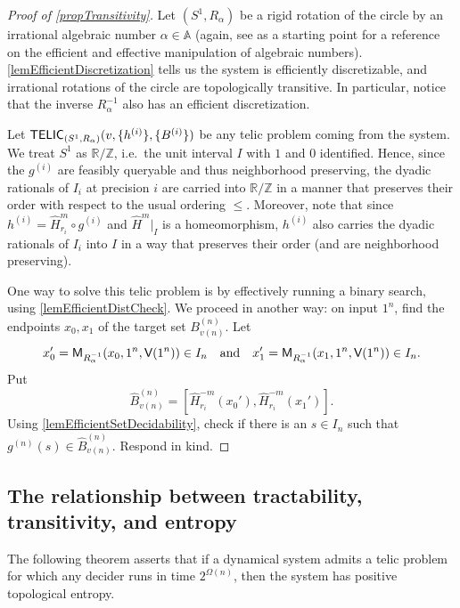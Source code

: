 \documentclass{amsart}
\theoremstyle{theorem}
\theoremstyle{remark}
\numberwithin{equation}{section}
\renewcommand{\AA}{\mathbb{A}}
\newcommand{\RR}{\mathbb{R}}
\newcommand{\ZZ}{\mathbb{Z}}
\newcommand{\ccM}{\textsf{\upshape M}}
\newcommand{\ccV}{\textsf{\upshape V}}
\newcommand{\ccTELIC}{\textsf{\upshape TELIC}}
\begin{document}
\begin{proof}[Proof of \cref{propTransitivity}]
Let $(S^1, R_\alpha)$ be a rigid rotation of the circle by an irrational algebraic number $\alpha \in \AA$ (again, see \cite{basu2006algorithms} as a starting point for a reference on the efficient and effective manipulation of algebraic numbers). \cref{lemEfficientDiscretization} tells us the system is efficiently discretizable, and irrational rotations of the circle are topologically transitive. In particular, notice that the inverse $R_\alpha^{-1}$ also has an efficient discretization.

Let $\ccTELIC_{(S^1, R_\alpha)}(v, \{h^{(i)}\},\{B^{(i)}\})$ be any telic problem coming from the system. We treat $S^1$ as $\RR/\ZZ$, i.e.\ the unit interval $I$ with $1$ and $0$ identified. Hence, since the $g^{(i)}$ are feasibly queryable and thus neighborhood preserving, the dyadic rationals of $I_i$ at precision $i$ are carried into $\RR/\ZZ$ in a manner that preserves their order with respect to the usual ordering $\leq$. Moreover, note that since $h^{(i)} = \hat{H}_{r_i}^m \circ g^{(i)}$ and $\hat{H}^m|_I$ is a homeomorphism, $h^{(i)}$ also carries the dyadic rationals of $I_i$ into $I$ in a way that preserves their order (and are neighborhood preserving). 

One way to solve this telic problem is by effectively running a binary search, using \cref{lemEfficientDistCheck}. We proceed in another way: on input $1^n$, find the endpoints $x_0, x_1$ of the target set $B^{(n)}_{v(n)}$. Let
\[
x_0' = \ccM_{R_\alpha^{-1}}(x_0, 1^{n}, \ccV(1^n)) \in I_n \quad \text{and}\quad x_1' = \ccM_{R_\alpha^{-1}}(x_1, 1^{n}, \ccV(1^n)) \in I_n.
\]
Put
\[
\hat{B}^{(n)}_{v(n)} = [\hat{H}_{r_i}^{-m}(x_0'), \hat{H}_{r_i}^{-m}(x_1')].
\]
Using \cref{lemEfficientSetDecidability}, check if there is an $s \in I_n$ such that $g^{(n)}(s) \in \hat{B}^{(n)}_{v(n)}$. Respond in kind.
\end{proof}



\subsection{The relationship between tractability, transitivity, and entropy}\label{secTelicSensitivity}

The following theorem asserts that if a dynamical system admits a telic problem for which any decider runs in time $2^{\Omega(n)}$, then the system has positive topological entropy.
\end{document}
